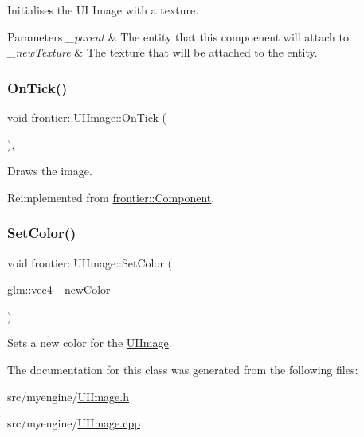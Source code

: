 Initialises the UI Image with a texture. 


\begin{DoxyParams}{Parameters}
{\em \+\_\+parent} & The entity that this compoenent will attach to. \\
\hline
{\em \+\_\+new\+Texture} & The texture that will be attached to the entity. \\
\hline
\end{DoxyParams}
\mbox{\label{classfrontier_1_1_u_i_image_a4e0d055c0add55fa5e63ae892ea59498}} 
\subsubsection{\texorpdfstring{On\+Tick()}{OnTick()}}
{\footnotesize\ttfamily void frontier\+::\+U\+I\+Image\+::\+On\+Tick (\begin{DoxyParamCaption}{ }\end{DoxyParamCaption})\hspace{0.3cm}{\ttfamily [override]}, {\ttfamily [virtual]}}



Draws the image. 



Reimplemented from \hyperlink{classfrontier_1_1_component_ab920f9bc07ce051ebb5559c5a66508d1}{frontier\+::\+Component}.

\mbox{\label{classfrontier_1_1_u_i_image_a4d6851a91889ce7815a8697f9bc42126}} 
\subsubsection{\texorpdfstring{Set\+Color()}{SetColor()}}
{\footnotesize\ttfamily void frontier\+::\+U\+I\+Image\+::\+Set\+Color (\begin{DoxyParamCaption}\item[{glm\+::vec4}]{\+\_\+new\+Color }\end{DoxyParamCaption})}



Sets a new color for the \hyperlink{classfrontier_1_1_u_i_image}{U\+I\+Image}. 



The documentation for this class was generated from the following files\+:\begin{DoxyCompactItemize}
\item 
src/myengine/\hyperlink{_u_i_image_8h}{U\+I\+Image.\+h}\item 
src/myengine/\hyperlink{_u_i_image_8cpp}{U\+I\+Image.\+cpp}\end{DoxyCompactItemize}
